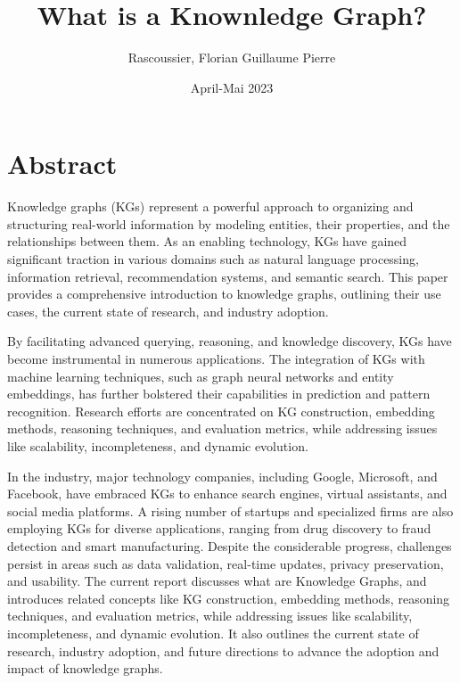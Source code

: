 \documentclass[12pt]{report} %
\title{What is a Knownledge Graph?}
\author{Rascoussier, Florian Guillaume Pierre}
\date{April-Mai 2023}
\begin{document}

\newpage

\frontmatter
%


\tableofcontents
\newpage

\section*{Abstract}
Knowledge graphs (\gls{KG}s) represent a powerful approach to organizing and structuring real-world information by modeling entities, their properties, and the relationships between them. As an enabling technology, KGs have gained significant traction in various domains such as natural language processing, information retrieval, recommendation systems, and semantic search. This paper provides a comprehensive introduction to knowledge graphs, outlining their use cases, the current state of research, and industry adoption.

By facilitating advanced querying, reasoning, and knowledge discovery, KGs have become instrumental in numerous applications. The integration of KGs with machine learning techniques, such as graph neural networks and entity embeddings, has further bolstered their capabilities in prediction and pattern recognition. Research efforts are concentrated on KG construction, embedding methods, reasoning techniques, and evaluation metrics, while addressing issues like scalability, incompleteness, and dynamic evolution.

In the industry, major technology companies, including Google, Microsoft, and Facebook, have embraced KGs to enhance search engines, virtual assistants, and social media platforms. A rising number of startups and specialized firms are also employing KGs for diverse applications, ranging from drug discovery to fraud detection and smart manufacturing. Despite the considerable progress, challenges persist in areas such as data validation, real-time updates, privacy preservation, and usability. The current report discusses what are Knowledge Graphs, and introduces related concepts like \gls{KG} construction, embedding methods, reasoning techniques, and evaluation metrics, while addressing issues like scalability, incompleteness, and dynamic evolution. It also outlines the current state of research, industry adoption, and future directions to advance the adoption and impact of knowledge graphs.
\end{document}
